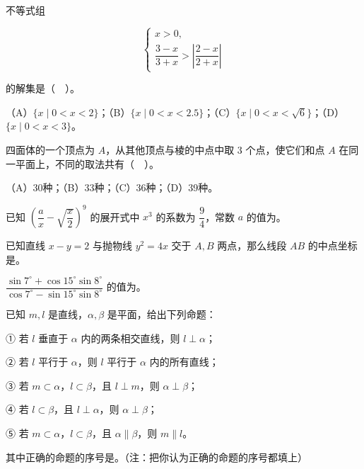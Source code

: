 \begin{question}
不等式组

\nopagebreak[4]
\[
\begin{cases}
x>0,\\
\dfrac{3-x}{3+x}>\left|\dfrac{2-x}{2+x}\right|
\end{cases}
\]

的解集是（　）。

（A）$\{x\mid0<x<2\}$；（B）$\{x\mid0<x<2.5\}$；（C）$\{x\mid0<x<\sqrt6\}$；（D）$\{x\mid0<x<3\}$。

\end{question}
\begin{question}
四面体的一个顶点为 $A$，从其他顶点与棱的中点中取 $3$ 个点，使它们和点 $A$ 在同一平面上，不同的取法共有（　）。

（A）30种；（B）33种；（C）36种；（D）39种。

\end{question}

\begin{question}
已知 $\left(\dfrac ax-\sqrt{\dfrac x2}\right)^9$ 的展开式中 $x^3$ 的系数为 $\dfrac94$，常数 $a$ 的值为\gkblank{}。

\end{question}
\begin{question}
已知直线 $x-y=2$ 与抛物线 $y^2=4x$ 交于 $A,B$ 两点，那么线段 $AB$ 的中点坐标是\gkblank{}。

\end{question}
\begin{question}
$\dfrac{\sin7^\circ+\cos15^\circ\sin8^\circ}{\cos7^\circ-\sin15^\circ\sin8^\circ}$ 的值为\gkblank{}。

\end{question}
\begin{question}
已知 $m,l$ 是直线，$\alpha,\beta$ 是平面，给出下列命题：

① 若 $l$ 垂直于 $\alpha$ 内的两条相交直线，则 $l\perp\alpha$；

② 若 $l$ 平行于 $\alpha$，则 $l$ 平行于 $\alpha$ 内的所有直线；

③ 若 $m\subset\alpha$，$l\subset\beta$，且 $l\perp m$，则 $\alpha\perp\beta$；

④ 若 $l\subset\beta$，且 $l\perp\alpha$，则 $\alpha\perp\beta$；

⑤ 若 $m\subset\alpha$，$l\subset\beta$，且 $\alpha\parallel\beta$，则 $m\parallel l$。

其中正确的命题的序号是\gkblank{}。（注：把你认为正确的命题的序号都填上）

\end{question}

